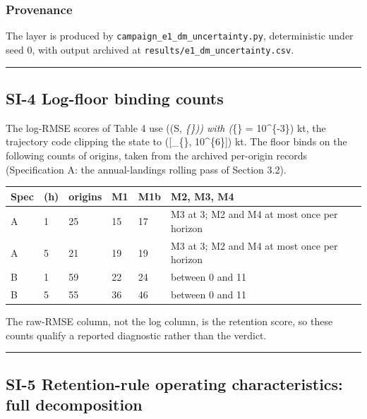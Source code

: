 \documentclass[11pt]{article}
\begin{document}
\subsubsection{Provenance}\label{provenance}

The layer is produced by \texttt{campaign\_e1\_dm\_uncertainty.py},
deterministic under seed 0, with output archived at
\texttt{results/e1\_dm\_uncertainty.csv}.

\begin{center}\rule{0.5\linewidth}{0.5pt}\end{center}

\subsection{SI-4 Log-floor binding
counts}\label{si-4-log-floor-binding-counts}

The log-RMSE scores of Table 4 use (\log\max(\hat S,
\varepsilon\emph{\{\})) with (\varepsilon}\{\} =
10\^{}\{-3\}) kt, the trajectory code clipping the state to
({[}\varepsilon\_\{\}, 10\^{}\{6\}{]}) kt. The floor binds
on the following counts of origins, taken from the archived per-origin
records (Specification A: the annual-landings rolling pass of Section
3.2).

{\def\LTcaptype{none} %
\begin{longtable}[]{@{}llllll@{}}
\toprule\noalign{}
Spec & (h) & origins & M1 & M1b & M2, M3, M4 \\
\midrule\noalign{}
\endhead
\bottomrule\noalign{}
\endlastfoot
A & 1 & 25 & 15 & 17 & M3 at 3; M2 and M4 at most once per horizon \\
A & 5 & 21 & 19 & 19 & M3 at 3; M2 and M4 at most once per horizon \\
B & 1 & 59 & 22 & 24 & between 0 and 11 \\
B & 5 & 55 & 36 & 46 & between 0 and 11 \\
\end{longtable}
}

The raw-RMSE column, not the log column, is the retention score, so
these counts qualify a reported diagnostic rather than the verdict.

\begin{center}\rule{0.5\linewidth}{0.5pt}\end{center}

\subsection{SI-5 Retention-rule operating characteristics: full
decomposition}\label{si-5-retention-rule-operating-characteristics-full-decomposition}
\end{document}
